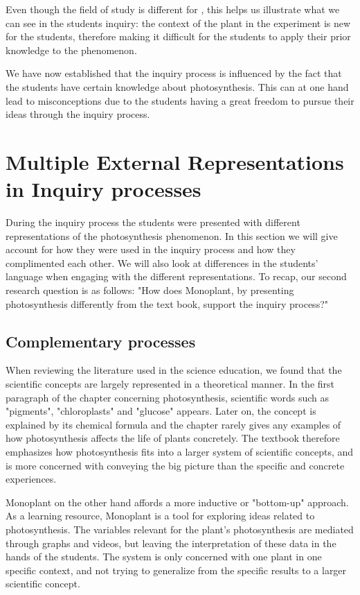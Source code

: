Even though the field of study is different for \citeauthor{klahr1993heuristics}, this helps us illustrate what we can see in the students inquiry: the context of the plant in the experiment is new for the students, therefore making it difficult for the students to apply their prior knowledge to the phenomenon. 

We have now established that the inquiry process is influenced by the fact that the students have certain knowledge about photosynthesis. This can at one hand lead to misconceptions due to the students having a great freedom to pursue their ideas through the inquiry process. 







\section{Multiple External Representations in Inquiry processes}
During the inquiry process the students were presented with different representations of the photosynthesis phenomenon. In this section we will give account for how they were used in the inquiry process and how they complimented each other. We will also look at differences in the students' language when engaging with the different representations. To recap, our second research question is as follows: "How does Monoplant, by presenting photosynthesis differently from the text book, support the inquiry process?"

\subsection{Complementary processes}
When reviewing the literature used in the science education, we found that the scientific concepts are largely represented in a theoretical manner. In the first paragraph of the chapter concerning photosynthesis, scientific words such as "pigments", "chloroplasts" and "glucose" appears. Later on, the concept is explained by its chemical formula and the chapter rarely gives any examples of how photosynthesis affects the life of plants concretely. The textbook therefore emphasizes how photosynthesis fits into a larger system of scientific concepts, and is more concerned with conveying the big picture than the specific and concrete experiences. 

Monoplant on the other hand affords a more inductive or "bottom-up" approach. As a learning resource, Monoplant is a tool for exploring ideas related to photosynthesis. The variables relevant for the plant's photosynthesis are mediated through graphs and videos, but leaving the interpretation of these data in the hands of the students. The system is only concerned with one plant in one specific context, and not trying to generalize from the specific results to a larger scientific concept. 

